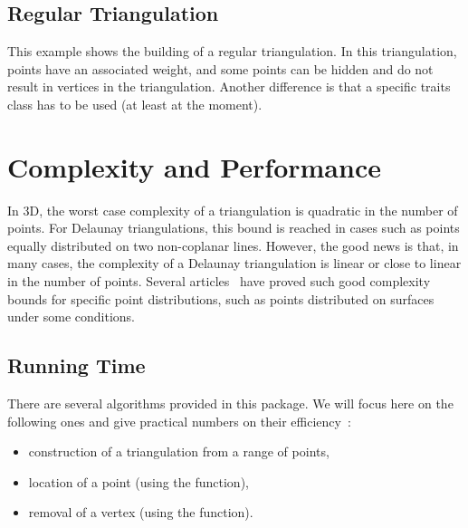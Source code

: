 
\subsection{Regular Triangulation}
This example shows the building of a regular triangulation.  In this
triangulation, points have an associated weight, and some points can
be hidden and do not result in vertices in the triangulation.
Another difference is that a specific traits class has to be used
(at least at the moment).


\section{Complexity and Performance\label{Triangulation3-sec-complexity}}

In 3D, the worst case complexity of a triangulation is quadratic in the number
of points.  For Delaunay triangulations, this bound is reached in cases such as
points equally distributed on two non-coplanar lines.  However, the good news
is that, in many cases, the complexity of a Delaunay triangulation is linear or
close to linear in the number of points.  Several
articles~\cite{d-hdvdl-89,e-dpssdt-02,geometrica-5986i,prisme-4453a,prisme-abl-03}
have proved such good complexity bounds for specific point distributions, such
as points distributed on surfaces under some conditions.

\subsection{Running Time}

There are several algorithms provided in this package.  We will focus here on
the following ones and give practical numbers on their efficiency~:
\begin{itemize}
\item construction of a triangulation from a range of points, 
\item location of a point (using the  function),
\item removal of a vertex (using the  function).
\end{itemize}

